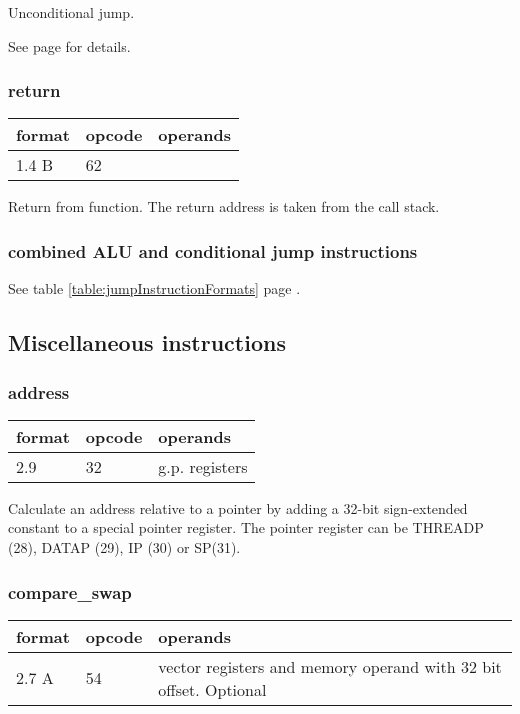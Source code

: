 \documentclass[forwardcom.tex]{subfiles}
\begin{document}
Unconditional jump.
\vspace{2mm}

See page \pageref{table:jumpInstructionFormats} for details.

\subsubsection{return}
\label{table:jumpInstruction}
\begin{tabular}{|p{12mm}|p{12mm}|p{110mm}|}
\hline
\bfseries format & \bfseries opcode & \bfseries operands \\ \hline
1.4 B & 62 & \\ \hline
\end{tabular}
\vspace{2mm}

Return from function. The return address is taken from the call stack.

\subsubsection{combined ALU and conditional jump instructions}
See table \ref{table:jumpInstructionFormats} page \pageref{table:jumpInstructionFormats}.
\vspace{4mm}

\subsection{Miscellaneous instructions}

\subsubsection{address}
\label{table:addressInstruction}
\begin{tabular}{|p{12mm}|p{12mm}|p{110mm}|}
\hline
\bfseries format & \bfseries opcode & \bfseries operands \\ \hline
2.9 & 32 & g.p. registers \\ \hline
\end{tabular}
\vspace{2mm}

Calculate an address relative to a pointer by adding a 32-bit sign-extended constant to a special pointer register. The pointer register can be THREADP (28), DATAP (29), IP (30) or SP(31).

\subsubsection{compare\_swap}
\label{table:compareSwapInstruction}
\begin{tabular}{|p{12mm}|p{12mm}|p{110mm}|}
\hline
\bfseries format & \bfseries opcode & \bfseries operands \\ \hline
2.7 A & 54 & vector registers and memory operand with 32 bit offset. Optional \\ \hline
\end{tabular}
\vspace{2mm}
\end{document}
